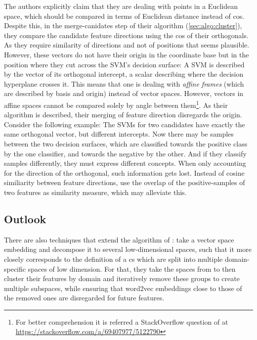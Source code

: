 The authors explicitly claim that they are dealing with points in a Euclidean space, which should be compared in terms of Euclidean distance \cite[14]{Derrac2015} instead of \gls{cos}. Despite this, in the merge-canidates step of their algorithm (\autoref{sec:algo:cluster}), they compare the candidate feature directions using the \gls{cos} of their orthogonals. As they require similarity of directions and not of positions that seems plausible. However, these vectors do not have their origin in the coordinate base but in the position where they cut across the SVM's decision surface: A SVM is described by the vector of its orthogonal intercept, a scalar describing where the decision hyperplane crosses it. This means that one is dealing with \textit{affine frames} (which are described by basis and origin) instead of vector spaces. However, vectors in affine spaces cannot be compared solely by angle between them\footnote{For better comprehension it is referred a StackOverflow question of \me at \url{https://stackoverflow.com/a/69407977/5122790}}. As their algorithm is described, their merging of feature direction disregards the origin. Consider the following example: The SVMs for two candidates have exactly the same orthogonal vector, but different intercepts. Now there may be samples between the two decision surfaces, which are classified towards the positive class by the one classifier, and towards the negative by the other. And if they classify samples differently, they must express different concepts. When only accounting for the direction of the orthogonal, such information gets lost. Instead of cosine similiarity between feature directions, \cite{Alshaikh2019} use the overlap of the positive-samples of two features as similarity measure, which may alleviate this.

\subsection{Outlook}

There are also techniques that extend the algorithm of \textcite{Derrac2015}: \textcite{Alshaikh2019} take a vector space embedding and decompose it to several low-dimensional spaces, such that it more closely corresponds to the definition of a \gls{cs} which are split into multiple domain-specific spaces of low dimension. For that, they take the spaces from \cite{Derrac2015} to then cluster their features by domain and iteratively remove these groups to create multiple subspaces, while ensuring that \gls{word2vec} embeddings close to those of the removed ones are disregarded for future features.

